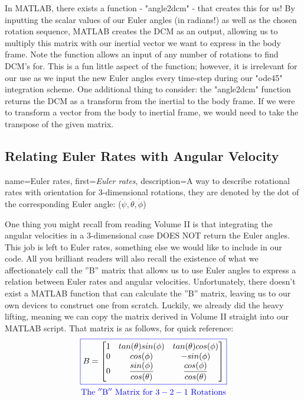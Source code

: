 \documentclass[12pt]{report}
\begin{document}
In MATLAB, there exists a function - "angle2dcm" - that creates this for us! By inputting the scalar values of our Euler angles (in radians!) as well as the chosen rotation sequence, MATLAB creates the DCM as an output, allowing us to multiply this matrix with our inertial vector we want to express in the body frame. Note the function allows an input of any number of rotations to find DCM's for. This is a fun little aspect of the function; however, it is irrelevant for our use as we input the new Euler angles every time-step during our "ode45" integration scheme. One additional thing to consider: the "angle2dcm" function returns the DCM as a transform from the inertial to the body frame. If we were to transform a vector from the body to inertial frame, we would need to take the transpose of the given matrix.

\subsection{Relating Euler Rates with Angular Velocity}

{
    name=Euler rates,
    first={\textit{Euler rates}},
    description={A way to describe rotational rates with orientation for 3-dimensional rotations, they are denoted by the dot of the corresponding Euler angle: ($\dot{\psi},\dot{\theta},\dot{\phi}$)}
}

One thing you might recall from reading Volume II is that integrating the angular velocities in a 3-dimensional case DOES NOT return the Euler angles. This job is left to Euler rates, something else we would like to include in our code. All you brilliant readers will also recall the existence of what we affectionately call the ''B'' matrix that allows us to use Euler angles to express a relation between Euler rates and angular velocities. Unfortunately, there doesn't exist a MATLAB function that can calculate the ''B'' matrix, leaving us to our own devices to construct one from scratch. Luckily, we already did the heavy lifting, meaning we can copy the matrix derived in Volume II straight into our MATLAB script. That matrix is as follows, for quick reference:
\begin{gather}
    \color{blue}\boxed{\color{black}B=\begin{bmatrix}
    1&tan(\theta)sin(\phi)&tan(\theta)cos(\phi)\\
    0&cos(\phi)&-sin(\phi)\\
    0&\dfrac{sin(\phi)}{cos(\theta)}&\dfrac{cos(\phi)}{cos(\theta)}
\end{bmatrix}}\\\color{blue}\mathrm{The\ ''B''\ Matrix\ for\ 3-2-1\ Rotations}
\end{gather}
\end{document}
